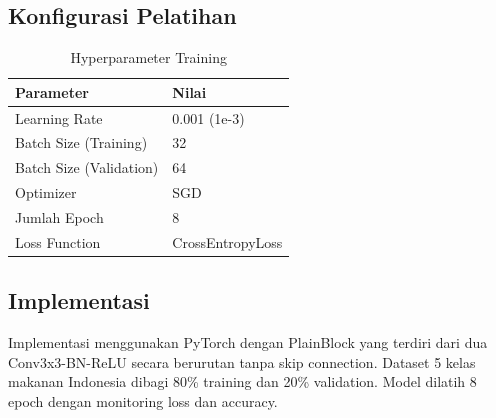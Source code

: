 \documentclass[11pt,a4paper]{article}
\begin{document}
\subsection{Konfigurasi Pelatihan}
\begin{table}[h]
\centering
\caption{Hyperparameter Training}
\begin{tabular}{|l|l|}
\hline
\textbf{Parameter} & \textbf{Nilai} \\ \hline
Learning Rate & 0.001 (1e-3) \\ \hline
Batch Size (Training) & 32 \\ \hline
Batch Size (Validation) & 64 \\ \hline
Optimizer & SGD \\ \hline
Jumlah Epoch & 8 \\ \hline
Loss Function & CrossEntropyLoss \\ \hline
\end{tabular}
\end{table}

\subsection{Implementasi}
Implementasi menggunakan PyTorch dengan PlainBlock yang terdiri dari dua Conv3x3-BN-ReLU secara berurutan tanpa skip connection. Dataset 5 kelas makanan Indonesia dibagi 80\% training dan 20\% validation. Model dilatih 8 epoch dengan monitoring loss dan accuracy.
\end{document}
